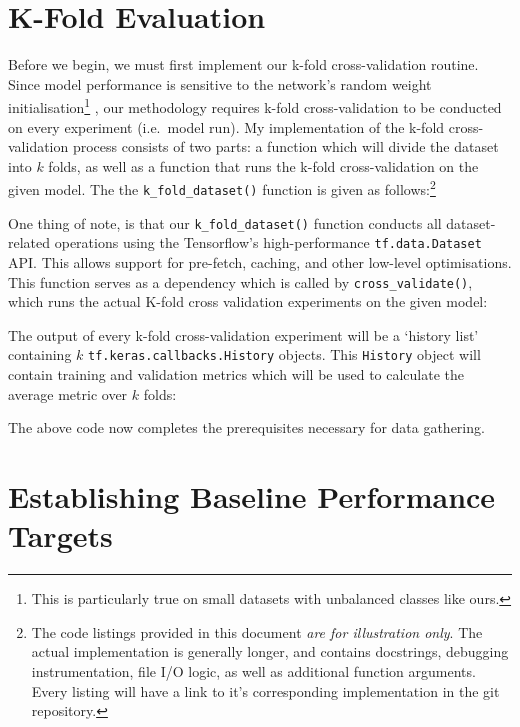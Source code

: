 \section{K-Fold Evaluation}

Before we begin, we must first implement our k-fold cross-validation routine. Since model performance is sensitive to the network's random weight initialisation\footnote{This is particularly true on small datasets with unbalanced classes like ours.} \autocite{Narkhede2022}, our methodology requires k-fold cross-validation to be conducted on every experiment (i.e.\ model run). My implementation of the k-fold cross-validation process consists of two parts: a function which will divide the dataset into \(k\) folds, as well as a function that runs the k-fold cross-validation on the given model. The the \texttt{k_fold_dataset()} function is given as follows:\footnote{The code listings provided in this document \emph{are for illustration only}. The actual implementation is generally longer, and contains docstrings, debugging instrumentation, file I/O logic, as well as additional function arguments. Every listing will have a link to it's corresponding implementation in the git repository.}



\noindent
One thing of note, is that our \texttt{k_fold_dataset()} function conducts all dataset-related operations using the Tensorflow's high-performance \texttt{tf.data.Dataset} API. This allows support for pre-fetch, caching, and other low-level optimisations. This function serves as a dependency which is called by \texttt{cross_validate()}, which runs the actual K-fold cross validation experiments on the given model:



\noindent
The output of every k-fold cross-validation experiment will be a \enquote*{history list} containing \(k\) \texttt{tf.keras.callbacks.History} objects. This \texttt{History} object will contain training and validation metrics which will be used to calculate the average metric over \(k\) folds:



\noindent
The above code now completes the prerequisites necessary for data gathering.

\section{Establishing Baseline Performance Targets}


